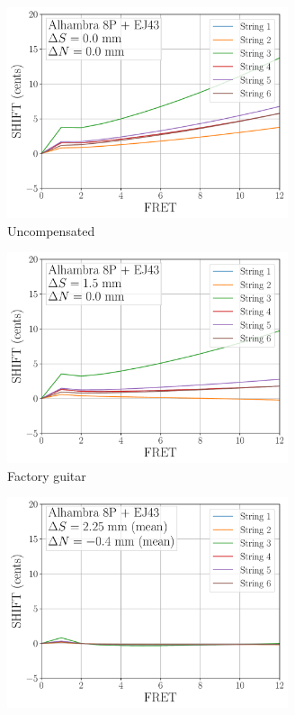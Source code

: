  \begin{figure}
  \centering
  \begin{subfigure}[b]{0.45\textwidth}
   \centering
   \includegraphics[width=3.25in]{figures/shift_alhambra8p_ej43_null}
   \caption{Uncompensated}
   \label{fig:shift_alhambra8p_ej43_null}
  \end{subfigure}
  \hspace{0.25in}
  \begin{subfigure}[b]{0.45\textwidth}
   \centering
   \includegraphics[width=3.25in]{figures/shift_alhambra8p_ej43_factory}
   \caption{Factory guitar}
   \label{fig:shift_alhambra8p_ej43_factory}
  \end{subfigure}
  \par\vspace{0.25in}
  \begin{subfigure}[b]{0.45\textwidth}
   \centering
   \includegraphics[width=3.25in]{figures/shift_alhambra8p_ej43_full}

\end{subfigure}
\end{figure}
